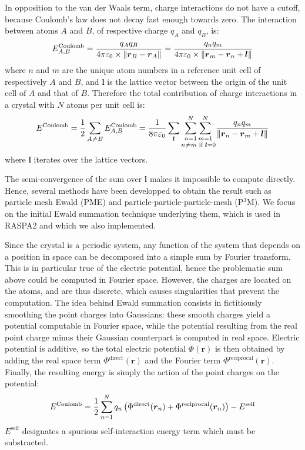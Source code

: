 \documentclass[main.tex]{subfiles}
\begin{document}
In opposition to the van der Waals term, charge interactions do not have a cutoff, because Coulomb's law does not decay fast enough towards zero. The interaction between atoms $A$ and $B$, of respective charge $q_A$ and $q_B$, is:
\[E^\text{Coulomb}_{A,B} = \frac{q_A q_B}{4\pi\varepsilon_0\times \left\|\boldsymbol r_B - \boldsymbol r_A\right\|} = \frac{q_n q_m}{4\pi\varepsilon_0\times \left\|\boldsymbol r_m - \boldsymbol r_n + \boldsymbol l\right\|}\]
where $n$ and $m$ are the unique atom numbers in a reference unit cell of respectively $A$ and $B$, and $\boldsymbol l$ is the lattice vector between the origin of the unit cell of $A$ and that of $B$.
Therefore the total contribution of charge interactions in a crystal with $N$ atoms per unit cell is:
\[E^\text{Coulomb} = \frac12\sum_{A\not\kern0.2ex= B}E^\text{Coulomb}_{A,B}
                   = \frac1{8\pi\varepsilon_0}\sum_{\boldsymbol l}\underset{n\not\kern0.2ex= m\text{ if }\boldsymbol l = 0}{\sum_{n=1}^N\sum_{m=1}^N} \frac{q_n q_m}{\left\|\boldsymbol r_n - \boldsymbol r_m + \boldsymbol l\right\|}\]
where $\boldsymbol l$ iterates over the lattice vectors.

The semi-convergence of the sum over $\boldsymbol l$ makes it impossible to compute directly. Hence, several methods have been developped to obtain the result such as particle mesh Ewald (PME) and particle-particle-particle-mesh (P$^3$M). We focus on the initial Ewald summation technique underlying them, which is used in RASPA2 and which we also implemented.

Since the crystal is a periodic system, any function of the system that depends on a position in space can be decomposed into a simple sum by Fourier transform. This is in particular true of the electric potential, hence the problematic sum above could be computed in Fourier space. However, the charges are located on the atoms, and are thus discrete, which causes singularities that prevent the computation. The idea behind Ewald summation consists in fictitiously smoothing the point charges into Gaussians: these smooth charges yield a potential computable in Fourier space, while the potential resulting from the real point charge minus their Gaussian counterpart is computed in real space. Electric potential is additive, so the total electric potential $\Phi(\boldsymbol r)$ is then obtained by adding the real space term $\Phi^\text{direct}(\boldsymbol r)$ and the Fourier term $\Phi^\text{reciprocal}(\boldsymbol r)$. Finally, the resulting energy is simply the action of the point charges on the potential:
\[E^\text{Coulomb} = \frac12\sum_{n=1}^N q_n\left(\Phi^\text{direct}(\boldsymbol r_n) + \Phi^\text{reciprocal}(\boldsymbol r_n)\right) - E^{\text{self}}\]
$E^{\text{self}}$ designates a spurious self-interaction energy term which must be substracted.
\end{document}
